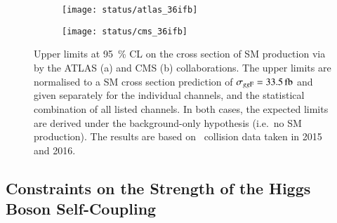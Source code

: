 \begin{figure}[htbp]
  \centering

  \begin{subfigure}[b]{0.9\textwidth}
    \centering

    \texttt{[image: status/atlas\_36ifb]}

  \end{subfigure}

  \vspace{0.5em}

  \begin{subfigure}[b]{0.9\textwidth}
    \centering

    \texttt{[image: status/cms\_36ifb]}

  \end{subfigure}

  \caption[Upper limits on the SM~\HH production cross section by the ATLAS and
  CMS collaborations based on \pp~collision data taken in 2015 and 2016.]{Upper
    limits at \SI{95}{\percent} CL on the cross section of SM \HH production via
    \ggF by the ATLAS (a) and CMS (b) collaborations. The upper limits are
    normalised to a SM cross section prediction of
    $\sigma_{\ggF} = \SI{33.5}{\femto\barn}$ and given separately for the
    individual channels, and the statistical combination of all listed
    channels. In both cases, the expected limits are derived under the
    background-only hypothesis (i.e.\ no SM \HH production). The results are
    based on \pp~collision data taken in 2015 and 2016.}%
  \label{fig:prior_status_smhh}
\end{figure}


\subsection*{Constraints on the Strength of the Higgs Boson Self-Coupling}%
\label{sec:past_results_klambda}

